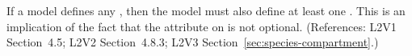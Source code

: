 If a model defines any \Species, then the model must also define at least
one \Compartment.  This is an implication of the fact that the
 attribute on \Species is not optional.  (References: L2V1
Section~4.5; L2V2 Section~4.8.3; L2V3 Section~\ref{sec:species-compartment}.)

